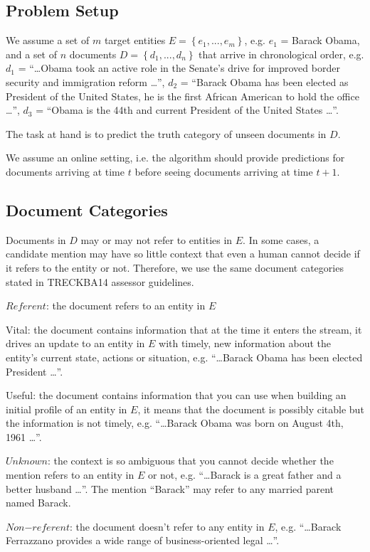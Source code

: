 \documentclass{article}
\begin{document}
\subsection{Problem Setup}
\label{setup}

We assume a set of $m$ target entities $E = \left\{ {e_1, ..., e_m}\right\}$, e.g. $e_1$ = Barack Obama, and a set of $n$ documents $D = \left\{ {d_1, ..., d_n}\right\}$ that arrive in chronological order, e.g. $d_1$ = ``\dots Obama took an active role in the Senate's drive for improved border security and immigration reform \dots'', $d_2$ = ``Barack Obama has been elected as President of the United States, he is the first African American to hold the office \dots'', $d_3$ = ``Obama is the 44th and current President of the United States \dots''.

The task at hand is to predict the truth category of unseen documents in $D$.

We assume an online setting, i.e. the algorithm should provide predictions for documents arriving at time $t$ before seeing documents arriving at time $t+1$.

\subsection{Document Categories}
\label{categories}

Documents in $D$ may or may not refer to entities in $E$. In some cases, a candidate mention may have so little context that even a human cannot decide if it refers to the entity or not. Therefore, we use the same document categories stated in TRECKBA14 assessor guidelines.

\begin{itemize*}
  \item $Referent$: the document refers to an entity in $E$
    \begin{itemize*}
      \item Vital: the document contains information that at the time it enters the stream, it drives an update to an entity in $E$ with timely, new information about the entity's current state, actions or situation, e.g. ``\dots Barack Obama has been elected President \dots''.
      \item Useful: the document contains information that you can use when building an initial profile of an entity in $E$, it means that the document is possibly citable but the information is not timely, e.g. ``\dots Barack Obama was born on August 4th, 1961 \dots''.
    \end{itemize*}
  \item $Unknown$: the context is so ambiguous that you cannot decide whether the mention refers to an entity in $E$ or not, e.g. ``\dots Barack is a great father and a better husband \dots''. The mention ``Barack'' may refer to any married parent named Barack.
  \item $Non\mathord{-}referent$: the document doesn't refer to any entity in $E$, e.g. ``\dots Barack Ferrazzano provides a wide range of business-oriented legal \dots''.
\end{itemize*}
\end{document}
